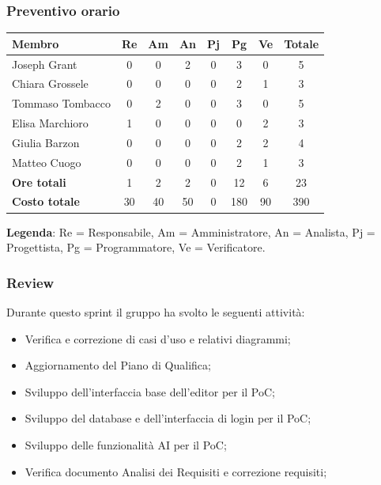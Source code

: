 \documentclass[11pt,a4paper]{article}
\begin{document}
\subsubsection{Preventivo orario}
\begin{center}
    \begin{tabular}{|l|c|c|c|c|c|c|c|}
        \hline
        \textbf{Membro} & \textbf{Re} & \textbf{Am} & \textbf{An} & \textbf{Pj} & \textbf{Pg} & \textbf{Ve} & \textbf{Totale} \\
        \hline
        Joseph Grant & 0 & 0 & 2 & 0 & 3 & 0 & 5 \\
        \hline
        Chiara Grossele & 0 & 0 & 0 & 0 & 2 & 1 & 3 \\
        \hline
        Tommaso Tombacco & 0 & 2 & 0 & 0 & 3 & 0 & 5 \\
        \hline
        Elisa Marchioro & 1 & 0 & 0 & 0 & 0 & 2 & 3 \\
        \hline
        Giulia Barzon & 0 & 0 & 0 & 0 & 2 & 2 & 4 \\
        \hline
        Matteo Cuogo & 0 & 0 & 0 & 0 & 2 & 1 & 3 \\
        \hline
        \textbf{Ore totali} & 1 & 2 & 2 & 0 & 12 & 6 & 23 \\
        \hline
        \textbf{Costo totale} & 30 & 40 & 50 & 0 & 180 & 90 & 390 \\
        \hline
    \end{tabular}
\end{center}

\noindent \textbf{Legenda}: Re = Responsabile, Am = Amministratore, An = Analista, Pj = Progettista, Pg = Programmatore, Ve = Verificatore.

\subsubsection{Review}
Durante questo sprint il gruppo ha svolto le seguenti attività:

\begin{itemize}
        \item Verifica e correzione di casi d'uso e relativi diagrammi;
        \item Aggiornamento del Piano di Qualifica;
        \item Sviluppo dell'interfaccia base dell'editor per il PoC;
        \item Sviluppo del database e dell'interfaccia di login per il PoC;
        \item Sviluppo delle funzionalità AI per il PoC;
        \item Verifica documento Analisi dei Requisiti e correzione requisiti;
    \end{itemize}
\end{document}
